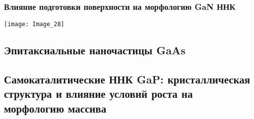 \begin{frame}
	\frametitle{Влияние подготовки поверхности на морфологию GaN ННК}
	\centering
	\texttt{[image: Image\_28]}
\end{frame}

\subsection{Эпитаксиальные наночастицы GaAs}

\subsection{Самокаталитические ННК GaP: кристаллическая структура и влияние условий роста на морфологию массива}
